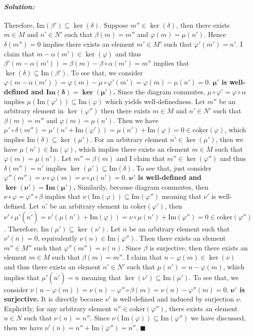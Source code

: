 \documentclass[12pt, a4paper]{article}
\theoremstyle{remark}
\newenvironment{solution}
  {\paragraph{\textit{Solution:}}\par\medskip}
  {\hfill$\blacksquare$\vspace{0.1cm}}
\begin{document}
\begin{solution}
    Therefore, $\text{Im}(\beta')\subseteq \ker(\delta)$. Suppose $m''\in\ker(\delta)$, then there exists $m\in M$ and $n'\in N'$ such that $\beta(m)=m''$ and $\varphi(m)=\mu(n')$.
    Hence $\delta(m'')=0$ implies there exists an element $m'\in M'$ such that $\varphi'(m')=n'$.  I claim that $m-\alpha(m')\in \ker(\varphi)$ and thus $\beta'(m-\alpha(m'))=\beta(m)-\beta\circ\alpha(m')=m''$ implies 
    that $\ker(\delta)\subseteq\text{Im}(\beta')$. To see that, we consider $\varphi(m-\alpha(m')) = \varphi(m) -\mu\circ\varphi'(m') = \varphi(m)-\mu(n')=0$.
    \textbf{$\bm{\mu'}$ is well-defined and $\bm{\textbf{Im}(\delta)=\ker(\mu')}$.} Since the diagram commutes, $\mu\circ\varphi' = \varphi\circ\alpha$ implies $\mu(\text{Im}(\varphi'))\subseteq \text{Im}(\varphi)$ which 
    yields well-definedness. Let $m''$ be an arbitrary element in $\ker(\varphi'')$ then there exists $m\in M$ and $n'\in N'$ such that $\beta(m) = m''$ and $\varphi(m)=\mu(n')$. Then we have $\mu'\circ\delta(m'') = \mu'(n'+\text{Im}(\varphi')) = \mu(n') + \text{Im}(\varphi)=0\in\text{coker}(\varphi)$,
    which implies $\text{Im}(\delta)\subseteq \ker(\mu')$. For an arbitrary element $\overline{n'}\in\ker(\mu')$, then we have 
    $\mu(n')\in\text{Im}(\varphi)$, which implies there exists an element $m\in M$ such that $\varphi(m)=\mu(n')$. Let $m'' = \beta(m)$ and I claim that $m''\in \ker(\varphi'')$
    and thus $\delta(m'') = \overline{n'}$ implies $\ker(\mu')\subseteq \text{Im}(\delta)$. To see that, just consider $\varphi''(m'')=\nu\circ\varphi(m) = \nu\circ\mu(n')=0$.
    \textbf{$\bm{\nu'}$ is well-defined and $\bm{\ker(\nu')=\textbf{Im}(\mu')}$.} Similarily, because diagram commutes, then $\nu\circ\varphi = \varphi''\circ\beta$ implies that $\nu(\text{Im}(\varphi))\subseteq \text{Im}(\varphi'')$
    meaning that $\nu'$ is well-defined. Let $\overline{n'}$ be an arbitrary element in $\text{coker}(\varphi')$, then $\nu'\circ\mu'(\overline{n'}) = \nu'(\mu(n')+\text{Im}(\varphi))= \nu\circ\mu (n') + \text{Im}(\varphi'') = 0\in \text{coker}(\varphi'')$.
    Therefore, $\text{Im}(\mu')\subseteq \ker(\nu')$. Let $\overline{n}$ be an arbitrary element such that $\nu'(\overline{n})=0$, equivalently $\nu(n)\in \text{Im}(\varphi'')$. Then there exists
    an element $m''\in M''$ such that $\varphi''(m'')=\nu(n)$. Since $\beta$ is surjective, then there exists an element $m\in M$ such that $\beta(m)=m''$. I claim that 
    $n-\varphi(m)\in\ker(\nu)$ and thus there exists an element $n'\in N'$ such that $\mu(n')= n-\varphi(m)$, which implies that $\mu'(\overline{n'}) = \overline{n}$ meaning that $\ker(\nu')\subseteq\text{Im}(\mu')$.
    To see that, we consider $\nu(n-\varphi(m)) = \nu(n)-\varphi''\circ\beta(m)=\nu(n)-\varphi''(m)=0$.
    \textbf{$\bm\nu'$ is surjective.} It is directly because $\nu'$ is well-defined and induced by surjection $\nu$. Explicitly, for any arbitrary element $\overline{n''}\in\text{coker}(\varphi'')$, there exists an element $n\in N$ such that 
    $\nu(n)=n''$. Since $\nu(\text{Im}(\varphi))\subseteq \text{Im}(\varphi'')$ we have discussed, then we have $\nu'(\overline{n})=n''+\text{Im}(\varphi'')=\overline{n''}$. 
\end{solution}
\end{document}
